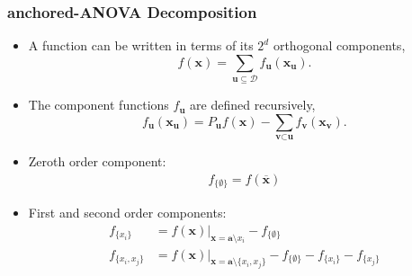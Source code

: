 \documentclass{beamer}
\begin{document}
\begin{frame}
\frametitle{anchored-ANOVA Decomposition}

\begin{itemize}
  \item A function can be written in terms of its $2^d$ orthogonal components,
\begin{equation} 
 f\left(\textbf{x}\right) = 
  \sum_{\textbf{u}\subseteq\mathcal{D}}
   f_{\textbf{u}}\left(\textbf{x}_{\textbf{u}}\right). \nonumber
\end{equation}
  \item The component functions $f_{\textbf{u}}$ are defined recursively,
\begin{equation} 
 f_{\textbf{u}}\left(\textbf{x}_{\textbf{u}}\right) = 
  P_{\textbf{u}}f\left(\textbf{x}\right) -
   \sum_{\textbf{v}\subset\textbf{u}}
    f_{\textbf{v}}\left(\textbf{x}_{\textbf{v}}\right). \nonumber 
\end{equation}
  \item Zeroth order component: 
\begin{align*}
 f_{\lbrace \emptyset \rbrace} = f(\overline{\textbf{x}}) 
\end{align*}
  \item First and second order components:
\begin{align*}
 f_{\lbrace x_i \rbrace} &= f\left(\textbf{x}\right)\vert_{\textbf{x} =
   \textbf{a}\setminus x_i} - f_{\lbrace \emptyset \rbrace} \\
 f_{\lbrace x_i, x_j \rbrace} &= f\left(\textbf{x}\right)\vert_{\textbf{x}=
   \textbf{a}\setminus \lbrace x_i, x_j \rbrace} - f_{\lbrace \emptyset \rbrace} -
    f_{\lbrace x_i \rbrace} - f_{\lbrace x_j \rbrace} 
\end{align*}
\end{itemize}

\end{frame}
\end{document}
